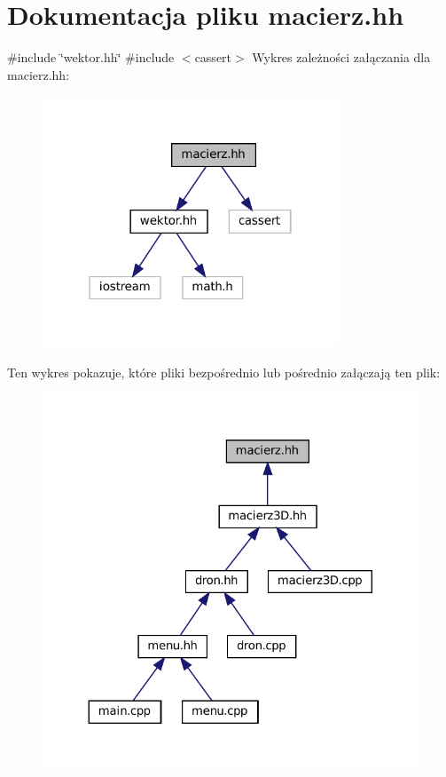 \hypertarget{macierz_8hh}{}\section{Dokumentacja pliku macierz.\+hh}
\label{macierz_8hh}
{\ttfamily \#include \char`\"{}wektor.\+hh\char`\"{}}\newline
{\ttfamily \#include $<$cassert$>$}\newline
Wykres zależności załączania dla macierz.\+hh\+:\nopagebreak
\begin{figure}[H]
\begin{center}
\leavevmode
\includegraphics[width=250pt]{macierz_8hh__incl}
\end{center}
\end{figure}
Ten wykres pokazuje, które pliki bezpośrednio lub pośrednio załączają ten plik\+:
\nopagebreak
\begin{figure}[H]
\begin{center}
\leavevmode
\includegraphics[width=324pt]{macierz_8hh__dep__incl}
\end{center}
\end{figure}

